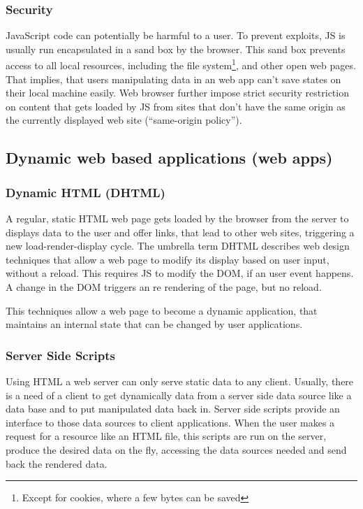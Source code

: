 
\subsubsection{Security}
JavaScript code can potentially be harmful to a user.
To prevent exploits, JS is usually run encapsulated in a sand box by the browser.
This sand box prevents access to all local resources, including the file system\footnote{Except for cookies, where a few bytes can be saved}, and other open web pages.
That implies, that users manipulating data in an web app can't save states on their local machine easily.
Web browser further impose strict security restriction on content that gets loaded by JS from sites that don't have the same origin as the currently displayed web site (``same-origin policy'').


\subsection{Dynamic web based applications (web apps)}
\label{sec:webapps}
\subsubsection{Dynamic HTML (DHTML)}
\label{DHTML}

A regular, static HTML web page gets loaded by the browser from the server to displays data to the user and offer links, that lead to other web sites, triggering a new load-render-display cycle.
The umbrella term DHTML describes web design techniques that allow a web page to modify its display based on user input, without a reload.
This requires JS to modify the DOM, if an user event happens.
A change in the DOM triggers an re rendering of the page, but no reload.

This techniques allow a web page to become a dynamic application, that maintains an internal state that can be changed by user applications.


\subsubsection{Server Side Scripts}
\label{sec:serverside}

Using HTML a web server can only serve static data to any client.
Usually, there is a need of a client to get dynamically data from a server side data source like a data base and to put manipulated data back in.
Server side scripts provide an interface to those data sources to client applications.
When the user makes a request for a resource like an HTML file, this scripts are run on the server, produce the desired data on the fly, accessing the data sources needed and send back the rendered data.

